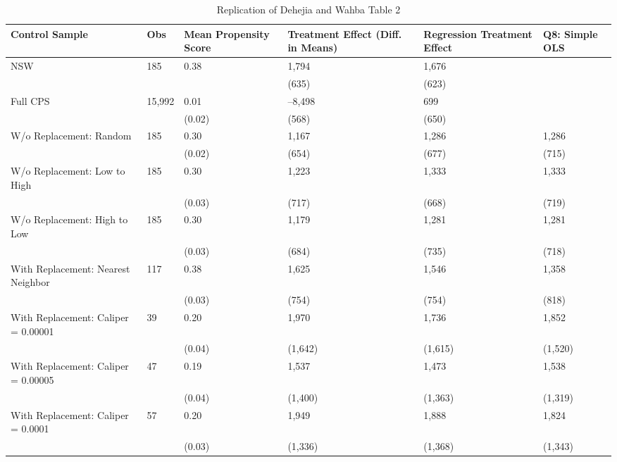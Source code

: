 \begin{table}[tbp] \centering
{}

\caption{Replication of Dehejia and Wahba Table 2}
\begin{tabularx}{\linewidth}{@{}lCCCCC@{}}

\toprule
{Control Sample}&{Obs}&{Mean Propensity Score}&{Treatment Effect (Diff. in Means)}&{Regression Treatment Effect}&{Q8: Simple OLS} \tabularnewline
\midrule \addlinespace[\belowrulesep]
NSW&185&0.38&1,794&1,676& \tabularnewline
&&&(635)&(623)& \tabularnewline
Full CPS&15,992&0.01&--8,498&699& \tabularnewline
&&(0.02)&(568)&(650)& \tabularnewline
W/o Replacement: Random&185&0.30&1,167&1,286&1,286 \tabularnewline
&&(0.02)&(654)&(677)&(715) \tabularnewline
W/o Replacement: Low to High&185&0.30&1,223&1,333&1,333 \tabularnewline
&&(0.03)&(717)&(668)&(719) \tabularnewline
W/o Replacement: High to Low&185&0.30&1,179&1,281&1,281 \tabularnewline
&&(0.03)&(684)&(735)&(718) \tabularnewline
With Replacement: Nearest Neighbor&117&0.38&1,625&1,546&1,358 \tabularnewline
&&(0.03)&(754)&(754)&(818) \tabularnewline
With Replacement: Caliper = 0.00001&39&0.20&1,970&1,736&1,852 \tabularnewline
&&(0.04)&(1,642)&(1,615)&(1,520) \tabularnewline
With Replacement: Caliper = 0.00005&47&0.19&1,537&1,473&1,538 \tabularnewline
&&(0.04)&(1,400)&(1,363)&(1,319) \tabularnewline
With Replacement: Caliper = 0.0001&57&0.20&1,949&1,888&1,824 \tabularnewline
&&(0.03)&(1,336)&(1,368)&(1,343) \tabularnewline
\bottomrule 

\end{tabularx}
\end{table}
